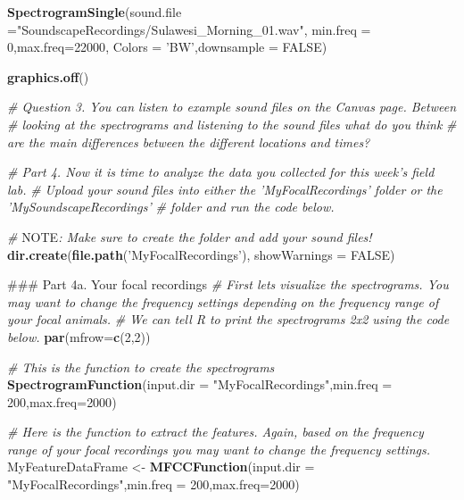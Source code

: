 \documentclass[]{book}
\newenvironment{Shaded}{\begin{snugshade}}{\end{snugshade}}
\newcommand{\AlertTok}[1]{\textcolor[rgb]{0.94,0.16,0.16}{#1}}
\newcommand{\CommentTok}[1]{\textcolor[rgb]{0.56,0.35,0.01}{\textit{#1}}}
\newcommand{\DataTypeTok}[1]{\textcolor[rgb]{0.13,0.29,0.53}{#1}}
\newcommand{\DecValTok}[1]{\textcolor[rgb]{0.00,0.00,0.81}{#1}}
\newcommand{\KeywordTok}[1]{\textcolor[rgb]{0.13,0.29,0.53}{\textbf{#1}}}
\newcommand{\NormalTok}[1]{#1}
\newcommand{\OtherTok}[1]{\textcolor[rgb]{0.56,0.35,0.01}{#1}}
\newcommand{\StringTok}[1]{\textcolor[rgb]{0.31,0.60,0.02}{#1}}
\begin{document}
\begin{Shaded}
\begin{Highlighting}[]
\KeywordTok{SpectrogramSingle}\NormalTok{(}\DataTypeTok{sound.file =}\StringTok{"SoundscapeRecordings/Sulawesi_Morning_01.wav"}\NormalTok{,}
                  \DataTypeTok{min.freq =} \DecValTok{0}\NormalTok{,}\DataTypeTok{max.freq=}\DecValTok{22000}\NormalTok{,}
                  \DataTypeTok{Colors =} \StringTok{'BW'}\NormalTok{,}\DataTypeTok{downsample =} \OtherTok{FALSE}\NormalTok{)}

\KeywordTok{graphics.off}\NormalTok{()}

\CommentTok{# Question 3. You can listen to example sound files on the Canvas page. Between}
\CommentTok{# looking at the spectrograms and listening to the sound files what do you think}
\CommentTok{# are the main differences between the different locations and times?}

\CommentTok{# Part 4. Now it is time to analyze the data you collected for this week's field lab.}
\CommentTok{# Upload your sound files into either the 'MyFocalRecordings' folder or the 'MySoundscapeRecordings'}
\CommentTok{# folder and run the code below.}

\CommentTok{# }\AlertTok{NOTE}\CommentTok{: Make sure to create the folder and add your sound files!}
\KeywordTok{dir.create}\NormalTok{(}\KeywordTok{file.path}\NormalTok{(}\StringTok{'MyFocalRecordings'}\NormalTok{), }\DataTypeTok{showWarnings =} \OtherTok{FALSE}\NormalTok{)}

\NormalTok{### Part 4a. Your focal recordings}
\CommentTok{# First lets visualize the spectrograms. You may want to change the frequency settings depending on the frequency range of your focal animals.}
\CommentTok{# We can tell R to print the spectrograms 2x2 using the code below.}
\KeywordTok{par}\NormalTok{(}\DataTypeTok{mfrow=}\KeywordTok{c}\NormalTok{(}\DecValTok{2}\NormalTok{,}\DecValTok{2}\NormalTok{))}

\CommentTok{# This is the function to create the spectrograms}
\KeywordTok{SpectrogramFunction}\NormalTok{(}\DataTypeTok{input.dir =} \StringTok{"MyFocalRecordings"}\NormalTok{,}\DataTypeTok{min.freq =} \DecValTok{200}\NormalTok{,}\DataTypeTok{max.freq=}\DecValTok{2000}\NormalTok{)}

\CommentTok{# Here is the function to extract the features. Again, based on the frequency range of your focal recordings you may want to change the frequency settings.}
\NormalTok{MyFeatureDataFrame <-}\StringTok{ }\KeywordTok{MFCCFunction}\NormalTok{(}\DataTypeTok{input.dir =} \StringTok{"MyFocalRecordings"}\NormalTok{,}\DataTypeTok{min.freq =} \DecValTok{200}\NormalTok{,}\DataTypeTok{max.freq=}\DecValTok{2000}\NormalTok{)}


\end{Highlighting}
\end{Shaded}
\end{document}
